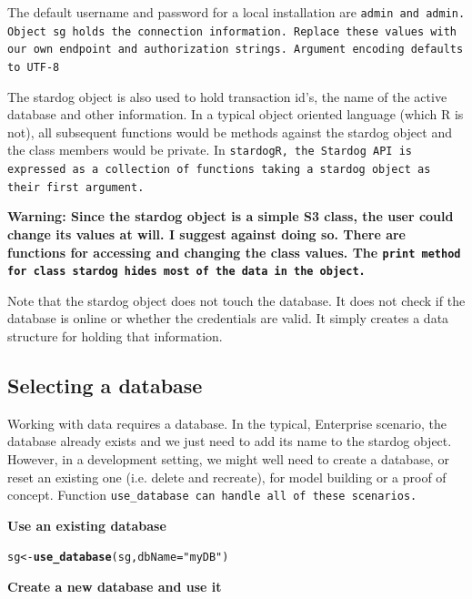 \documentclass{article}\usepackage[]{graphicx}\usepackage[]{xcolor}
\makeatletter
\newcommand{\hlstr}[1]{\textcolor[rgb]{0.192,0.494,0.8}{#1}}%
\newcommand{\hlstd}[1]{\textcolor[rgb]{0.345,0.345,0.345}{#1}}%
\newcommand{\hlkwb}[1]{\textcolor[rgb]{0.69,0.353,0.396}{#1}}%
\newcommand{\hlkwc}[1]{\textcolor[rgb]{0.333,0.667,0.333}{#1}}%
\newcommand{\hlkwd}[1]{\textcolor[rgb]{0.737,0.353,0.396}{\textbf{#1}}}%
\newenvironment{kframe}{%
 \def\at@end@of@kframe{}%
 \ifinner\ifhmode%
  \def\at@end@of@kframe{\end{minipage}}%
  \begin{minipage}{\columnwidth}%
 \fi\fi%
 \def\FrameCommand##1{\hskip\@totalleftmargin \hskip-\fboxsep
 \colorbox{shadecolor}{##1}\hskip-\fboxsep
     \hskip-\linewidth \hskip-\@totalleftmargin \hskip\columnwidth}%
 \MakeFramed {\advance\hsize-\width
   \@totalleftmargin\z@ \linewidth\hsize
   \@setminipage}}%
 {\par\unskip\endMakeFramed%
 \at@end@of@kframe}
\newenvironment{knitrout}{}{} %
\makeatother
\begin{document}
The default username and password for a local installation are \tt{admin} and \tt{admin}. Object \tt{sg} holds the connection information. Replace these values with our own endpoint and authorization strings. Argument \tt{encoding} defaults to UTF-8

The stardog object is also used to hold transaction id's, the name of the active database and other information. In a typical object oriented language (which R is not), all subsequent functions would be methods against the stardog object and the class members would be private. In \tt{stardogR}, the Stardog API is expressed as a collection of functions taking a stardog object as their first argument.

\bf{Warning:} Since the stardog object is a simple S3 class, the user could change its values at will. I suggest against doing so. There are functions for accessing and changing the class values. The \tt{print} method for class stardog hides most of the data in the object.

Note that the stardog object does not touch the database. It does not check if the database is online or whether the credentials are valid. It simply creates a data structure for holding that information.

\subsection{Selecting a database}

Working with data requires a database. In the typical, Enterprise scenario, the database already exists and we just need to add its name to the stardog object. However, in a development setting, we might well need to create a database, or reset an existing one (i.e. delete and recreate), for model building or a proof of concept. Function \tt{use\_database} can handle all of these scenarios.

\bf{Use an existing database}

\begin{knitrout}
\color{fgcolor}\begin{kframe}
\begin{alltt}
\hlstd{sg} \hlkwb{<-} \hlkwd{use_database}\hlstd{(sg,} \hlkwc{dbName} \hlstd{=} \hlstr{"myDB"}\hlstd{)}
\end{alltt}
\end{kframe}
\end{knitrout}

\bf{Create a new database and use it}
\end{document}
